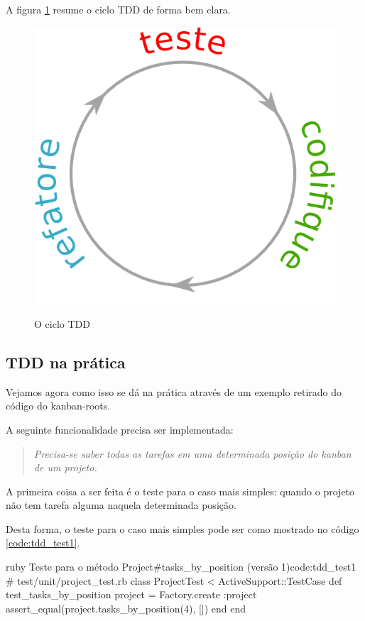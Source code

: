 A figura \ref{img:ciclo-tdd} resume o ciclo TDD de forma bem clara.

\begin{figure}[h]
  \center
  \caption{O ciclo TDD}
  \includegraphics[scale=0.45]{images/ciclo-tdd}
  \label{img:ciclo-tdd}
\end{figure}

\subsection{TDD na prática}
\label{ssub:tdd_na_pratica}

Vejamos agora como isso se dá na prática através de um exemplo retirado do código do kanban-roots.

A seguinte funcionalidade precisa ser implementada:

\begin{quote}
\textit{Precisa-se saber todas as tarefas em uma determinada posição do kanban de um projeto.}
\end{quote}

A primeira coisa a ser feita é o teste para o caso mais simples: quando o projeto não tem tarefa alguma naquela determinada posição.

Desta forma, o teste para o caso mais simples pode ser como mostrado no código \ref{code:tdd_test1}.

\begin{mycode}{ruby}%
{Teste para o método Project\#tasks\_by\_position (versão 1)}{code:tdd_test1}
# test/unit/project_test.rb
class ProjectTest < ActiveSupport::TestCase
  def test_tasks_by_position
    project = Factory.create :project
    assert_equal(project.tasks_by_position(4), [])
  end
end
\end{mycode}

